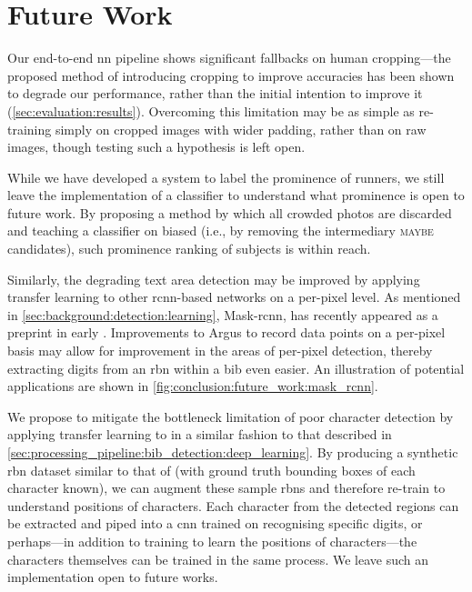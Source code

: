 \section{Future Work}

Our end-to-end \gls{nn} pipeline shows significant fallbacks on human cropping---the proposed method of introducing cropping to improve accuracies has been shown to degrade our performance, rather than the initial intention to improve it (\cref{sec:evaluation:results}). Overcoming this limitation may be as simple as re-training \frcnn{} simply on cropped images with wider padding, rather than on raw images, though testing such a hypothesis is left open.

While we have developed a system to label the prominence of runners, we still leave the implementation of a classifier to understand what prominence is open to future work. By proposing a method by which all crowded photos are discarded and teaching a classifier on biased  (i.e., by removing the intermediary \textsc{maybe} candidates), such prominence ranking of subjects is within reach.

Similarly, the degrading text area detection may be improved by applying transfer learning to other \gls{rcnn}-based networks on a per-pixel level. As mentioned in \cref{sec:background:detection:learning}, Mask-\gls{rcnn}, has recently appeared as a preprint in early \citeyear{He:2017ud}. Improvements to Argus to record data points on a per-pixel basis may allow for improvement in the areas of per-pixel detection, thereby extracting digits from an \gls{rbn} within a bib even easier. An illustration of potential applications are shown in \cref{fig:conclusion:future_work:mask_rcnn}.

We propose to mitigate the bottleneck limitation of poor character detection by applying transfer learning to \frcnn{} in a similar fashion to that described in \cref{sec:processing_pipeline:bib_detection:deep_learning}. By producing a synthetic \gls{rbn} dataset similar to that of \citet{Jaderberg:2014uy,Jaderberg:2016wj} (with ground truth bounding boxes of each character known), we can augment these sample \glspl{rbn} and therefore re-train \frcnn{} to understand positions of characters. Each character from the detected regions can be extracted and piped into a \gls{cnn} trained on recognising specific digits, or perhaps---in addition to training \frcnn{} to learn the positions of characters---the characters themselves can be trained in the same process. We leave such an implementation open to future works.

